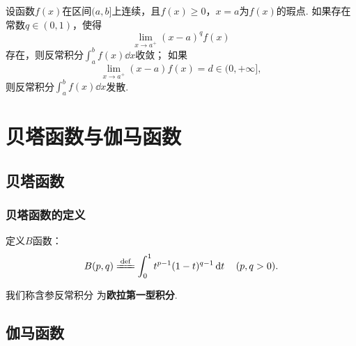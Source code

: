\begin{theorem}[极限审敛法]\label{theorem:定积分.无界函数的反常积分的极限审敛法}
设函数\(f(x)\)在区间\((a,b]\)上连续，且\(f(x) \geqslant 0\)，\(x=a\)为\(f(x)\)的瑕点.
如果存在常数\(q \in (0,1)\)，使得\[
\lim\limits_{x \to a^+} (x-a)^q f(x)
\]存在，则反常积分\(\int_a^b f(x) \dd{x}\)收敛；
如果\[
\lim\limits_{x \to a^+} (x-a) f(x) = d \in (0,+\infty],
\]则反常积分\(\int_a^b f(x) \dd{x}\)发散.
\end{theorem}

\section{贝塔函数与伽马函数}
\subsection{贝塔函数}
\subsubsection{贝塔函数的定义}
\begin{definition}
定义\(B\)函数：
\begin{equation}\label{equation:特殊函数.贝塔函数的定义式}
B(p,q)
\defeq
\int_0^1 t^{p-1} (1-t)^{q-1} \dd{t}
\quad(p,q>0).
\end{equation}
\end{definition}
我们称含参反常积分  为\textbf{欧拉第一型积分}.

\subsection{伽马函数}
